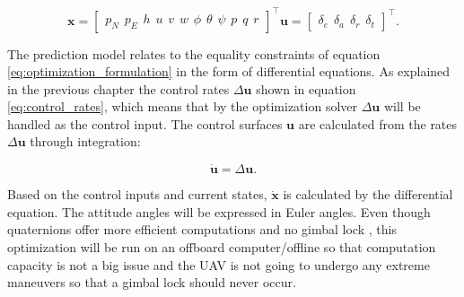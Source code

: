 \begin{subequations}
\begin{equation}
	\mathbf{x} =
	\begin{bmatrix}
		p_N \hspace{5pt} p_E \hspace{5pt} h \hspace{5pt}
		u \hspace{5pt} v \hspace{5pt} w \hspace{5pt}
		\phi \hspace{5pt} \theta \hspace{5pt} \psi \hspace{5pt}
		p \hspace{5pt} q \hspace{5pt} r
	\end{bmatrix}^\intercal
\end{equation}
\begin{equation}
	\mathbf{u} =
	\begin{bmatrix}
		\delta_e \hspace{5pt} \delta_a \hspace{5pt} \delta_r \hspace{5pt} \delta_t
	\end{bmatrix}^\intercal.
\end{equation}
\end{subequations}

The prediction model relates to the equality constraints of equation \ref{eq:optimization_formulation} in the form of differential equations. As explained in the previous chapter the control rates $\Delta\mathbf{u}$ shown in equation \ref{eq:control_rates}, which means that by the optimization solver $\Delta\mathbf{u}$ will be handled as the control input. The control surfaces $\mathbf{u}$ are calculated from the rates $\Delta\mathbf{u}$ through integration:

\begin{equation}
	\mathbf{\dot{u}} = \Delta\mathbf{u}.
\end{equation}

Based on the control inputs and current states, $\mathbf{\dot{x}}$ is calculated by the differential equation. The attitude angles will be expressed in Euler angles. Even though quaternions offer more efficient computations and no gimbal lock \cite{uavBEARD}, this optimization will be run on an offboard computer/offline so that computation capacity is not a big issue and the UAV is not going to undergo any extreme maneuvers so that a gimbal lock should never occur.



